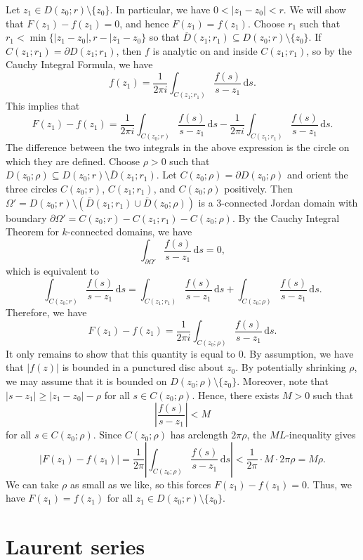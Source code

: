 \documentclass[10pt]{article}
\makeatletter
\newcommand{\dd}{\,\mathrm{d}}
\theoremstyle{newstyle}
\newenvironment{pf}[1][\proofname]{\par
  \pushQED{\qed}%
  \normalfont \topsep0\p@\relax
  \trivlist
  \item[\hskip\labelsep\scshape
  #1\@addpunct{.}]\ignorespaces
}{%
  \popQED\endtrivlist\@endpefalse
}
\makeatother
\begin{document}
\begin{pf}
Let $z_1 \in D(z_0; r) \setminus \{z_0\}$. In particular, we have $0 < |z_1 - z_0| < r$. We will show that
$F(z_1) - f(z_1) = 0$, and hence $F(z_1) = f(z_1)$. Choose $r_1$ such that 
$r_1 < \min\{|z_1 - z_0|, r - |z_1 - z_0\}$ so that $\overline D(z_1; r_1) \subseteq 
D(z_0; r) \setminus \{z_0\}$. If $C(z_1; r_1) = \partial D(z_1; r_1)$, then $f$ is analytic on 
and inside $C(z_1; r_1)$, so by the Cauchy Integral Formula, we have 
\[ f(z_1) = \frac{1}{2\pi i} \int_{C(z_1; r_1)} \frac{f(s)}{s-z_1}\dd s. \]
This implies that 
\[ F(z_1) - f(z_1) = \frac{1}{2\pi i} \int_{C(z_0; r)} \frac{f(s)}{s-z_1}\dd s - 
\frac{1}{2\pi i} \int_{C(z_1; r_1)} \frac{f(s)}{s-z_1}\dd s. \]
The difference between the two integrals in the above expression is the circle on which they are 
defined. Choose $\rho > 0$ such that $D(z_0; \rho) \subseteq D(z_0; r) \setminus 
\overline D(z_1; r_1)$. Let $C(z_0; \rho) = \partial D(z_0; \rho)$ and orient the 
three circles $C(z_0; r)$, $C(z_1; r_1)$, and $C(z_0; \rho)$ positively. Then 
$\Omega' = D(z_0; r) \setminus (\overline D(z_1; r_1) \cup \overline D(z_0; \rho))$ is a 
$3$-connected Jordan domain with boundary $\partial\Omega' = C(z_0; r) - C(z_1; r_1) - C(z_0; \rho)$. 
By the Cauchy Integral Theorem for $k$-connected domains, we have 
\[ \int_{\partial\Omega'} \frac{f(s)}{s-z_1}\dd s = 0, \] 
which is equivalent to 
\[ \int_{C(z_0; r)} \frac{f(s)}{s-z_1}\dd s = \int_{C(z_1; r_1)} \frac{f(s)}{s-z_1}\dd s 
+ \int_{C(z_0; \rho)} \frac{f(s)}{s-z_1}\dd s. \]
Therefore, we have 
\[ F(z_1) - f(z_1) = \frac{1}{2\pi i} \int_{C(z_0; \rho)} \frac{f(s)}{s-z_1}\dd s. \]
It only remains to show that this quantity is equal to $0$. 
By assumption, we have that $|f(z)|$ is bounded in a punctured disc about $z_0$. By 
potentially shrinking $\rho$, we may assume that it is bounded on $D(z_0; \rho) \setminus \{z_0\}$. 
Moreover, note that $|s - z_1| \geq |z_1 - z_0| - \rho$ for all $s \in C(z_0; \rho)$. 
Hence, there exists $M > 0$ such that 
\[ \left| \frac{f(s)}{s-z_1} \right| < M \]
for all $s \in C(z_0; \rho)$. Since $C(z_0; \rho)$ has arclength $2\pi\rho$, the $ML$-inequality gives 
\[ |F(z_1) - f(z_1)| = \frac{1}{2\pi} \left| \int_{C(z_0; \rho)} \frac{f(s)}{s-z_1}\dd s \right| 
< \frac{1}{2\pi} \cdot M \cdot 2\pi\rho = M\rho. \]
We can take $\rho$ as small as we like, so this forces $F(z_1) - f(z_1) = 0$. 
Thus, we have $F(z_1) = f(z_1)$ for all $z_1 \in D(z_0; r) \setminus \{z_0\}$. 
\end{pf}

\newpage 
\section{Laurent series}
\end{document}
